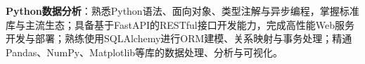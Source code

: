 \item \textbf{Python数据分析}：熟悉Python语法、面向对象、类型注解与异步编程，掌握标准库与主流生态；具备基于FastAPI的RESTful接口开发能力，完成高性能Web服务开发与部署；熟练使用SQLAlchemy进行ORM建模、关系映射与事务处理；精通Pandas、NumPy、Matplotlib等库的数据处理、分析与可视化。